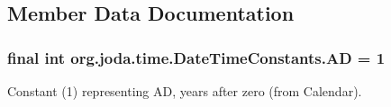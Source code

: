 \subsection{Member Data Documentation}
\hypertarget{classorg_1_1joda_1_1time_1_1_date_time_constants_a228b98aa67b9a507f187015edf31d7bf}{
\subsubsection[{A\-D}]{\setlength{\rightskip}{0pt plus 5cm}final int org.\-joda.\-time.\-Date\-Time\-Constants.\-A\-D = 1\hspace{0.3cm}{\ttfamily [static]}}}\label{classorg_1_1joda_1_1time_1_1_date_time_constants_a228b98aa67b9a507f187015edf31d7bf}
Constant (1) representing A\-D, years after zero (from Calendar). 

